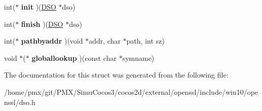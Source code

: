 \begin{DoxyCompactItemize}
int($\ast$ {\bfseries init} )(\hyperlink{structdso__st}{D\+SO} $\ast$dso)
\item 
\mbox{\label{structdso__meth__st_a936ec4fc5bf24889189556a37a3c83b7}} 
int($\ast$ {\bfseries finish} )(\hyperlink{structdso__st}{D\+SO} $\ast$dso)
\item 
\mbox{\label{structdso__meth__st_ae05dbf002bd9bf1d78d1ca833f225e4b}} 
int($\ast$ {\bfseries pathbyaddr} )(void $\ast$addr, char $\ast$path, int sz)
\item 
\mbox{\label{structdso__meth__st_a3aa2a99cee5689fdd4800498f4d791b6}} 
void $\ast$($\ast$ {\bfseries globallookup} )(const char $\ast$symname)
\end{DoxyCompactItemize}


The documentation for this struct was generated from the following file\+:\begin{DoxyCompactItemize}
\item 
/home/pmx/git/\+P\+M\+X/\+Simu\+Cocos3/cocos2d/external/openssl/include/win10/openssl/dso.\+h\end{DoxyCompactItemize}

